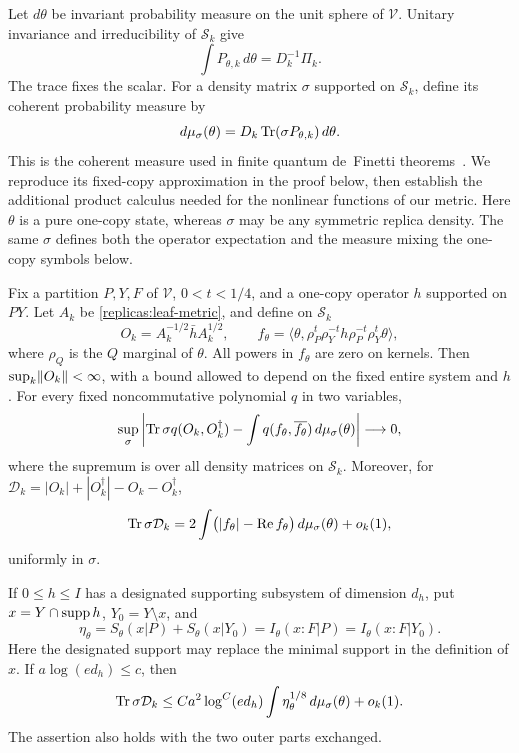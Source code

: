 Let $d\theta$ be invariant probability measure on the unit sphere of
$\mathcal V$.  Unitary invariance and irreducibility of $\mathcal S_k$
give
\begin{equation}\label{replicas:resolution}
 \int P_{\theta,k}\,d\theta=D_k^{-1}\Pi_k.
\end{equation}
The trace fixes the scalar.  For a density matrix $\sigma$ supported
on $\mathcal S_k$, define its coherent probability measure by
\begin{equation}\label{replicas:husimi}
d\mu_\sigma(\theta)=D_k\operatorname{Tr}(\sigma P_{\theta,k})\,d\theta.
\end{equation}
This is the coherent measure used in finite quantum de~Finetti
theorems~\cite{ChristandlEtAl2007,LewinNamRougerie2015}.  We reproduce its
fixed-copy approximation in the proof below, then establish the additional
product calculus needed for the nonlinear functions of our metric.
Here $\theta$ is a pure one-copy state, whereas $\sigma$ may be any
symmetric replica density.  The same $\sigma$ defines both the operator
expectation and the measure mixing the one-copy symbols below.

\begin{lemma}\label{lem:symbol}
Fix a partition $P,Y,F$ of $\mathcal V$, $0<t<1/4$, and a one-copy
operator $h$ supported on $PY$.  Let $A_k$ be
\eqref{replicas:leaf-metric}, and define on $\mathcal S_k$
\[
 O_k=A_k^{-1/2}\bar h A_k^{1/2},\qquad
 f_\theta=\langle\theta,
       \rho_P^t\rho_Y^{-t}h\rho_P^{-t}\rho_Y^t\theta\rangle,
\]
where $\rho_Q$ is the $Q$ marginal of $\theta$.  All powers in
$f_\theta$ are zero on kernels.  Then $\sup_k\lVert O_k\rVert<\infty$,
with a bound allowed to depend on the fixed entire system and $h$.
For every fixed noncommutative polynomial $q$ in two variables,
\begin{equation}\label{replicas:polynomial-symbol}
 \sup_{\sigma}
 \left|\operatorname{Tr}\sigma q(O_k,O_k^\dagger)
       -\int q(f_\theta,\overline{f_\theta})\,d\mu_\sigma(\theta)
 \right|\longrightarrow0,
\end{equation}
where the supremum is over all density matrices on $\mathcal S_k$.
Moreover, for $\mathcal D_k=|O_k|+|O_k^\dagger|-O_k-O_k^\dagger$,
\begin{equation}\label{replicas:skew-symbol}
 \operatorname{Tr}\sigma\mathcal D_k
 =2\int\bigl(|f_\theta|-\operatorname{Re}f_\theta\bigr)
                       \,d\mu_\sigma(\theta)+o_k(1),
\end{equation}
uniformly in $\sigma$.

If $0\le h\le I$ has a designated supporting subsystem of dimension
$d_h$, put $x=Y\cap\operatorname{supp} h$, $Y_0=Y\setminus x$, and
\[
 \eta_\theta=S_\theta(x|P)+S_\theta(x|Y_0)
            =I_\theta(x:F|P)=I_\theta(x:F|Y_0).
\]
Here the designated support may replace the minimal support in the
definition of $x$.  If $a\log(e d_h)\le c$, then
\begin{equation}\label{replicas:skew-bound}
 \operatorname{Tr}\sigma\mathcal D_k
 \le C a^2\log^C(e d_h)
                  \int\eta_\theta^{1/8}\,d\mu_\sigma(\theta)
                   +o_k(1).
\end{equation}
The assertion also holds with the two outer parts exchanged.
\end{lemma}

